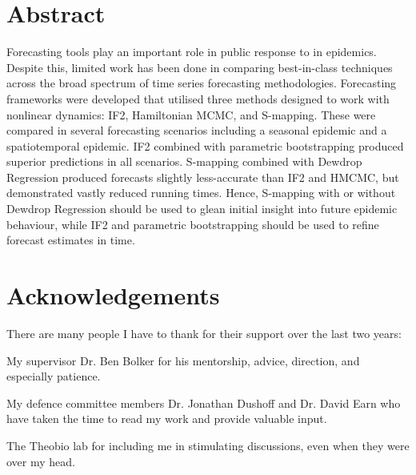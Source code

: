 \documentclass[12pt]{report}
\makeatletter
\let\org@subfile
\renewcommand*{}[1]{%
  \filename@parse{#1}%
  \expandafter
  \graphicspath\expandafter{\expandafter{\filename@area}}%
  \org@subfile{#1}%
}
\makeatother
\begin{document}
	


	

	\setcounter{page}{1}


	


	\chapter*{Abstract}

		Forecasting tools play an important role in public response to in epidemics. Despite this, limited work has been done in comparing best-in-class techniques across the broad spectrum of time series forecasting methodologies. Forecasting frameworks were developed that utilised three methods designed to work with nonlinear dynamics: IF2, Hamiltonian MCMC, and S-mapping. These were compared in several forecasting scenarios including a seasonal epidemic and a spatiotemporal epidemic. IF2 combined with parametric bootstrapping produced superior predictions in all scenarios. S-mapping combined with Dewdrop Regression produced forecasts slightly less-accurate than IF2 and HMCMC, but demonstrated vastly reduced running times. Hence, S-mapping with or without Dewdrop Regression should be used to glean initial insight into future epidemic behaviour, while IF2 and parametric bootstrapping should be used to refine forecast estimates in time.


	\chapter*{Acknowledgements}

		There are many people I have to thank for their support over the last two years:

		My supervisor Dr. Ben Bolker for his mentorship, advice, direction, and especially patience.

		My defence committee members Dr. Jonathan Dushoff and Dr. David Earn who have taken the time to read my work and provide valuable input.

		The Theobio lab for including me in stimulating discussions, even when they were over my head.
\end{document}
